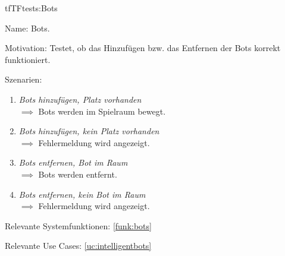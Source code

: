 \begin{description}[leftmargin=5em, style=sameline]

\begin{lhp}{tf}{TF}{tests:Bots }
	\item [Name:] Bots.
	\item [Motivation:] Testet, ob das Hinzufügen bzw. das Entfernen der Bots korrekt funktioniert.
	\item [Szenarien:] \hfill
		\begin{enumerate}
			\item \textit{Bots hinzufügen, Platz vorhanden} \\ $\implies$ Bots werden im Spielraum bewegt.
			\item \textit{Bots hinzufügen, kein Platz vorhanden} \\ $\implies$ Fehlermeldung wird angezeigt.
			\item \textit{Bots entfernen, Bot im Raum} \\ $\implies$ Bots werden entfernt.
			\item \textit{Bots entfernen, kein Bot im Raum} \\ $\implies$ Fehlermeldung wird angezeigt.
		\end{enumerate}
	\item [Relevante Systemfunktionen:] \ref{funk:bots}
	\item [Relevante Use Cases:] \ref{uc:intelligentbots}
\end{lhp}

\end{description}

